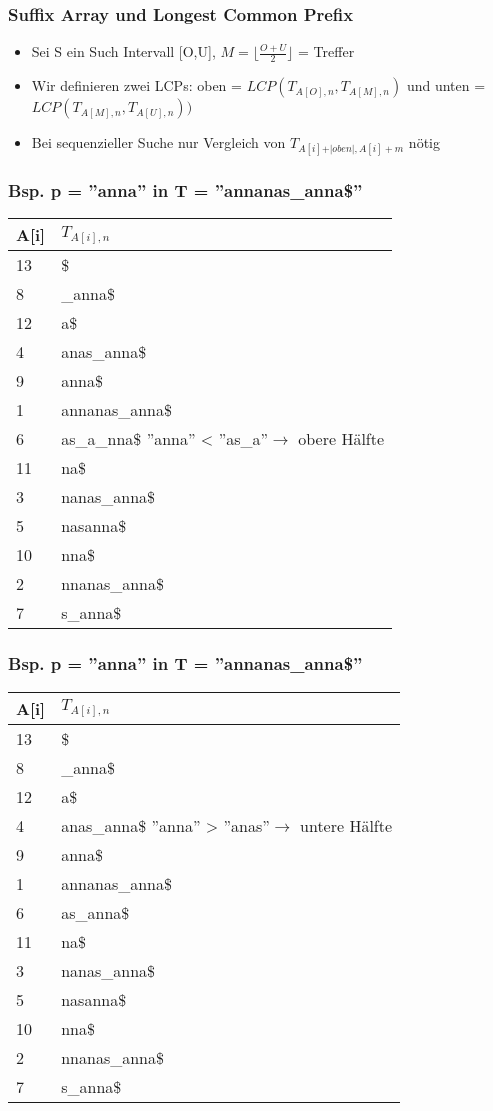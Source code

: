 \documentclass{beamer}
\begin{document}
\begin{frame}
\frametitle{Suffix Array und Longest Common Prefix}
\begin{itemize}
\item Sei S ein Such Intervall [O,U], $M = \lfloor \frac{O+U}{2}\rfloor$ = Treffer
\item Wir definieren zwei LCPs: oben = $LCP(T_{A[O],n},T_{A[M],n})$ und unten = $LCP(T_{A[M],n},T_{A[U],n}))$
\item Bei sequenzieller Suche nur Vergleich von $T_{A[i]+\vert oben\vert, A[i]+m}$ nötig
\end{itemize}
\end{frame}
\begin{frame}
\frametitle{Bsp. p = ''anna'' in T = ''annanas\_anna\$''}
\begin{tabular}{l|l<{\ttfamily}}
\textbf{A[i]} & $T_{A[i],n}$\\\hline
13 & \$\\
8 & \_anna\$\\
12 & a\$\\
4 & anas\_anna\$\\
9 & anna\$\\
1 & annanas\_anna\$\\
6 & \color{red}as\_a\color{black}\_nna\$ ''anna'' < \color{red}''as\_a''\color{black}$\rightarrow$ obere Hälfte\\%
11 & na\$\\
3 & nanas\_anna\$\\
5 & nasanna\$\\
10 & nna\$\\
2 & nnanas\_anna\$\\
7 & s\_anna\$\\
\end{tabular}
\end{frame}

\begin{frame}
\frametitle{Bsp. p = ''anna'' in T = ''annanas\_anna\$''}
\begin{tabular}{l|l<{\ttfamily}}
\textbf{A[i]} & $T_{A[i],n}$\\\hline
13 & \$\\
8 & \_anna\$\\
12 & a\$\\
4 & \color{red}anas\color{black}\_anna\$ ''anna'' > \color{red}''anas''\color{black}$\rightarrow$ untere Hälfte\\ %
9 & anna\$\\
1 & annanas\_anna\$\\
6 & as\_anna\$ \\
11 & \color{gray}na\$\\
3 & \color{gray}nanas\_anna\$\\
5 & \color{gray}nasanna\$\\
10 & \color{gray}nna\$\\
2 & \color{gray}nnanas\_anna\$\\
7 & \color{gray}s\_anna\$\\
\end{tabular}
\end{frame}
\end{document}
